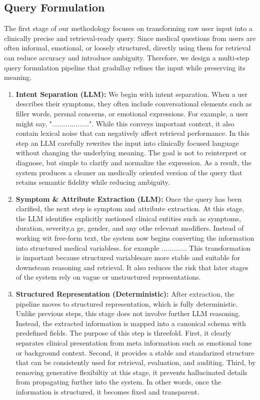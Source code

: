 \documentclass[conference, anonymous]{IEEEtran}
\begin{document}
\subsection{Query Formulation}
\label{subsec: query-formulation}
The first stage of our methodology focuses on transforming raw user input into a clinically precise and retrieval-ready query. Since medical questions from users are often informal, emotional, or loosely structured, directly using them for retrieval can reduce accuracy and introduce ambiguity. Therefore, we design a multi-step query formulation pipeline that gradullay refines the input while preserving its meaning. 
\begin{enumerate}
    \item \textbf{Intent Separation (LLM):} We begin with intent separation. When a uer describes their symptoms, they often include conversational elements such as filler words, persnal concerns, or emotional expressions. For example, a user might say, "...................". While this conveys important context, it also contain lexical noise that can negatively affect retrieval performance. In this step an LLM carefully rewrites the input into clinically focused language  without changing the underlying meaning. The goal is not to reinterpret or diagnose, but simple to clarify and normalize the expression. As a result, the system produces a cleaner an medically oriented version of the query that retains semantic fidelity while reducing ambiguity.
    
    \item \textbf{Symptom \& Attribute Extraction (LLM):} Once the query has been clarified, the next step is symptom and attribute extraction. At this stage, the LLM identifies explicitly metioned clinical entities such as symptoms, duration, severity,a ge, gender, and any othe relevant modifiers. Instead of working wit free-form text, the system now begins converting the information into structured medical variabless. for example ............. This transformation is important because structured variablesare more stable and suitable for downsteam reasoning and retrieval. It also reduces the risk that later stages of the system rely on vague or unstructured representations.  
    
    \item \textbf{Structured Representation (Deterministic):} After extraction, the pipeline moves to structured representation, which is fully deterministic. Unlike previous steps, this stage does not involve further LLM reasoning. Instead, the extracted information is mapped into a canonical schema with predefined fields. The purpose of this step is threefold. First, it clearly separates clinical presentation from meta information such as emotional tone or background context. Second, it provides a stable and standarized structure that can be consistently used for retrieval, evaluation, and auditing. Third, by removing generative flexibiltiy at this stage, it prevents hallucinated details from propagating further into the system. In other words, once the information is structured, it becomes fixed and transparent. 
    

\end{enumerate}
\end{document}
